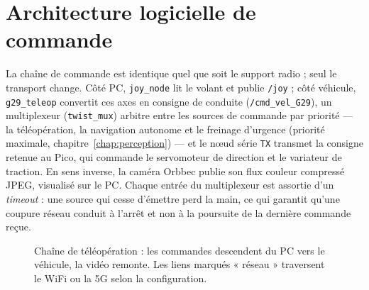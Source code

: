 \section{Architecture logicielle de commande}

La chaîne de commande est identique quel que soit le support radio ; seul le
transport change. Côté PC, \texttt{joy\_node} lit le volant et publie
\texttt{/joy} ; côté véhicule, \texttt{g29\_teleop} convertit ces axes en
consigne de conduite (\texttt{/cmd\_vel\_G29}), un multiplexeur
(\texttt{twist\_mux}) arbitre entre les sources de commande par priorité ---
la téléopération, la navigation autonome et le freinage d'urgence (priorité
maximale, chapitre~\ref{chap:perception}) --- et le nœud série \texttt{TX}
transmet la consigne retenue au Pico, qui commande le servomoteur de direction
et le variateur de traction. En sens inverse, la caméra Orbbec publie son flux
couleur compressé JPEG, visualisé sur le PC. Chaque entrée du multiplexeur est
assortie d'un \emph{timeout} : une source qui cesse d'émettre perd la main,
ce qui garantit qu'une coupure réseau conduit à l'arrêt et non à la poursuite
de la dernière commande reçue.

\begin{figure}[ht]
  \centering
  \caption{Chaîne de téléopération : les commandes descendent du PC vers le
  véhicule, la vidéo remonte. Les liens marqués « réseau » traversent le WiFi
  ou la 5G selon la configuration.}
  \label{fig:chaine-teleop}
\end{figure}

